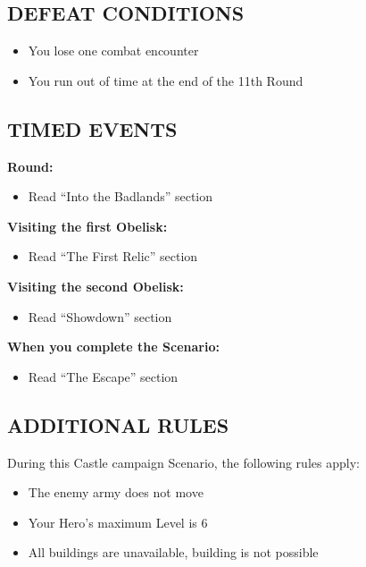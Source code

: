 \begin{multicols*}{2}
\subsection*{\MakeUppercase{Defeat Conditions}}
\begin{itemize}
  \item You lose one combat encounter
  \item You run out of time at the end of the 11th Round
\end{itemize}

\end{multicols*}

\newpage

\begin{multicols}{2}

\subsection*{\MakeUppercase{Timed Events}}

\textbf{ Round:}
\begin{itemize}
  \item Read ``Into the Badlands'' section
\end{itemize}

\textbf{Visiting the first Obelisk:}
\begin{itemize}
  \item Read ``The First Relic'' section
\end{itemize}

\textbf{Visiting the second Obelisk:}
\begin{itemize}
  \item Read ``Showdown'' section
\end{itemize}

\textbf{When you complete the Scenario:}
\begin{itemize}
  \item Read ``The Escape'' section
\end{itemize}



\subsection*{\MakeUppercase{Additional rules}}

During this Castle campaign Scenario, the following rules apply:

\begin{itemize}
  \item The enemy army does not move
  \item Your Hero's maximum Level is 6
  \item All buildings are unavailable, building is not possible
\end{itemize}


\end{multicols}
